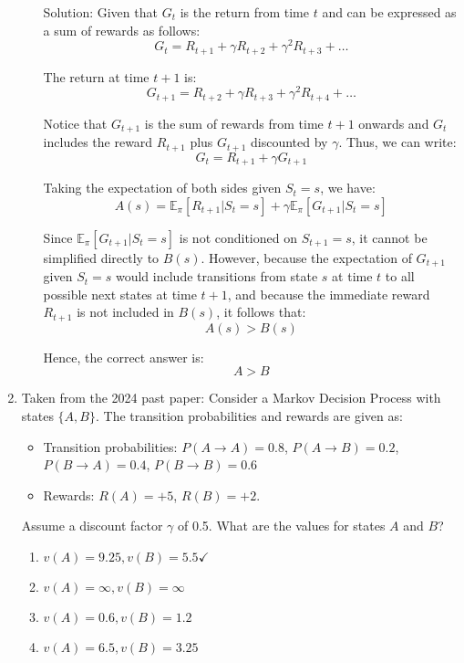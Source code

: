 \documentclass{report}
\numberwithin{equation}{section}
\begin{document}
\begin{enumerate}
\begin{enumerate}[label=\alph*.]
    Solution:
    Given that \(G_t\) is the return from time \(t\) and can be expressed as a sum of rewards as follows:
\[ G_t = R_{t+1} + \gamma R_{t+2} + \gamma^2 R_{t+3} + \ldots \]

The return at time \(t+1\) is:
\[ G_{t+1} = R_{t+2} + \gamma R_{t+3} + \gamma^2 R_{t+4} + \ldots \]

Notice that \(G_{t+1}\) is the sum of rewards from time \(t+1\) onwards and \(G_t\) includes the reward \(R_{t+1}\) plus \(G_{t+1}\) discounted by \(\gamma\). Thus, we can write:
\[ G_t = R_{t+1} + \gamma G_{t+1} \]

Taking the expectation of both sides given \(S_t = s\), we have:
\[ A(s) = \mathbb{E}_{\pi}[R_{t+1} | S_t = s] + \gamma \mathbb{E}_{\pi}[G_{t+1} | S_t = s] \]

Since \( \mathbb{E}_{\pi}[G_{t+1} | S_t = s] \) is not conditioned on \(S_{t+1} = s\), it cannot be simplified directly to \(B(s)\). However, because the expectation of \(G_{t+1}\) given \(S_t = s\) would include transitions from state \(s\) at time \(t\) to all possible next states at time \(t+1\), and because the immediate reward \(R_{t+1}\) is not included in \(B(s)\), it follows that:
\[ A(s) > B(s) \]

Hence, the correct answer is:
\[ A > B \]


\end{enumerate}
\item Taken from the 2024 past paper: 
Consider a Markov Decision Process with states \( \{A, B\} \). The transition probabilities and rewards are given as:

\begin{itemize}
\item Transition probabilities: \( P(A \rightarrow A) = 0.8 \), \( P(A \rightarrow B) = 0.2 \), \( P(B \rightarrow A) = 0.4 \), \( P(B \rightarrow B) = 0.6 \)
\item Rewards: \( R(A) = +5 \), \( R(B) = +2 \).
\end{itemize}

Assume a discount factor \( \gamma \) of 0.5. What are the values for states \( A \) and \( B \)?
\begin{enumerate}[label=\alph*.]
    \item \( v(A)=9.25, v(B)=5.5 \checkmark\)    
    \item \( v(A)=\infty, v(B)=\infty \)
    \item \( v(A)=0.6, v(B)=1.2 \)
    \item \( v(A)=6.5, v(B)=3.25 \)
\end{enumerate}


\end{enumerate}
\end{document}
